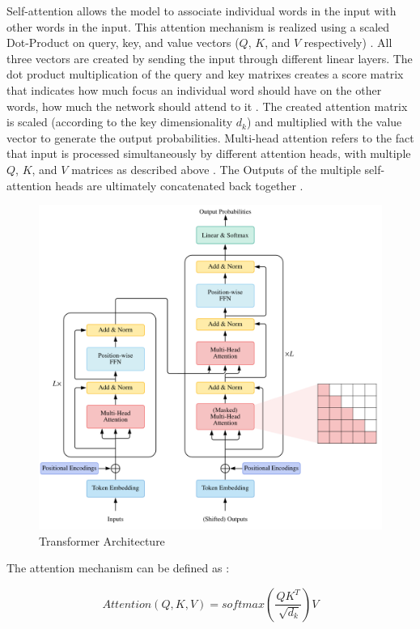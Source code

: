 Self-attention allows the \gls{model} to associate individual words in the input with other words in the input.
This attention mechanism is realized using a scaled Dot-Product on query, key, and value vectors ($Q$, $K$, and $V$ respectively) \cite{vaswani2017AttentionAllYou}.
All three vectors are created by sending the input through different linear layers.
The dot product multiplication of the query and key matrixes creates a score matrix that indicates how much focus an individual word should have on the other words, \ie how much the network should attend to it \cite{vaswani2017AttentionAllYou}.
The created attention matrix is scaled (according to the key dimensionality $d_k$) and multiplied with the value vector to generate the output probabilities.
Multi-head attention refers to the fact that input is processed simultaneously by different attention heads, \ie with multiple $Q$, $K$, and $V$ matrices as described above \cite{vaswani2017AttentionAllYou}.
The Outputs of the multiple self-attention heads are ultimately concatenated back together \cite{vaswani2017AttentionAllYou}.
\newpage %
\begin{figure}[t]
  \includegraphics[width=0.8\linewidth]{images/transformer.png}
\caption[Transformers]{Transformer Architecture \cite[Figure 1, p. 3]{lin2022SurveyTransformers}} \label{fig:transformer}
\end{figure}

The attention mechanism can be defined as \cite[p.4]{vaswani2017AttentionAllYou}:

\begin{equation}
  \label{eqn:attention}
  Attention(Q,K,V)=softmax(\frac{QK^T}{\sqrt[]{d_k}})V
\end{equation}

